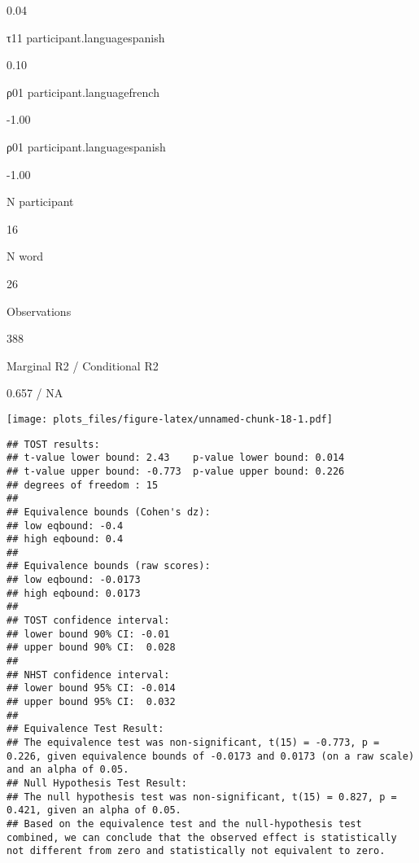 \documentclass[
]{article}
\begin{document}
0.04

τ11 participant.languagespanish

0.10

ρ01 participant.languagefrench

-1.00

ρ01 participant.languagespanish

-1.00

N participant

16

N word

26

Observations

388

Marginal R2 / Conditional R2

0.657 / NA

\texttt{[image: plots\_files/figure-latex/unnamed-chunk-18-1.pdf]}

\begin{verbatim}
## TOST results:
## t-value lower bound: 2.43    p-value lower bound: 0.014
## t-value upper bound: -0.773  p-value upper bound: 0.226
## degrees of freedom : 15
## 
## Equivalence bounds (Cohen's dz):
## low eqbound: -0.4 
## high eqbound: 0.4
## 
## Equivalence bounds (raw scores):
## low eqbound: -0.0173 
## high eqbound: 0.0173
## 
## TOST confidence interval:
## lower bound 90% CI: -0.01
## upper bound 90% CI:  0.028
## 
## NHST confidence interval:
## lower bound 95% CI: -0.014
## upper bound 95% CI:  0.032
## 
## Equivalence Test Result:
## The equivalence test was non-significant, t(15) = -0.773, p = 0.226, given equivalence bounds of -0.0173 and 0.0173 (on a raw scale) and an alpha of 0.05.
## Null Hypothesis Test Result:
## The null hypothesis test was non-significant, t(15) = 0.827, p = 0.421, given an alpha of 0.05.
## Based on the equivalence test and the null-hypothesis test combined, we can conclude that the observed effect is statistically not different from zero and statistically not equivalent to zero.
\end{verbatim}
\end{document}
